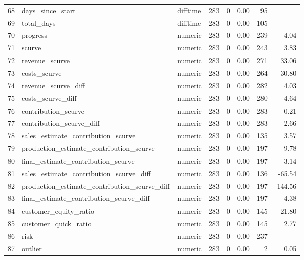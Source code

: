 \begin{sidewaystable}[ht]
\begin{tabular}{rllrrrrr}
  68 & days\_since\_start & difftime & 283 &   0 & 0.00 &  95 &  \\ 
  69 & total\_days & difftime & 283 &   0 & 0.00 & 105 &  \\ 
  70 & progress & numeric & 283 &   0 & 0.00 & 239 & 4.04 \\ 
  71 & scurve & numeric & 283 &   0 & 0.00 & 243 & 3.83 \\ 
  72 & revenue\_scurve & numeric & 283 &   0 & 0.00 & 271 & 33.06 \\ 
  73 & costs\_scurve & numeric & 283 &   0 & 0.00 & 264 & 30.80 \\ 
  74 & revenue\_scurve\_diff & numeric & 283 &   0 & 0.00 & 282 & 4.03 \\ 
  75 & costs\_scurve\_diff & numeric & 283 &   0 & 0.00 & 280 & 4.64 \\ 
  76 & contribution\_scurve & numeric & 283 &   0 & 0.00 & 283 & 0.21 \\ 
  77 & contribution\_scurve\_diff & numeric & 283 &   0 & 0.00 & 283 & -2.66 \\ 
  78 & sales\_estimate\_contribution\_scurve & numeric & 283 &   0 & 0.00 & 135 & 3.57 \\ 
  79 & production\_estimate\_contribution\_scurve & numeric & 283 &   0 & 0.00 & 197 & 9.78 \\ 
  80 & final\_estimate\_contribution\_scurve & numeric & 283 &   0 & 0.00 & 197 & 3.14 \\ 
  81 & sales\_estimate\_contribution\_scurve\_diff & numeric & 283 &   0 & 0.00 & 136 & -65.54 \\ 
  82 & production\_estimate\_contribution\_scurve\_diff & numeric & 283 &   0 & 0.00 & 197 & -144.56 \\ 
  83 & final\_estimate\_contribution\_scurve\_diff & numeric & 283 &   0 & 0.00 & 197 & -4.38 \\ 
  84 & customer\_equity\_ratio & numeric & 283 &   0 & 0.00 & 145 & 21.80 \\ 
  85 & customer\_quick\_ratio & numeric & 283 &   0 & 0.00 & 145 & 2.77 \\ 
  86 & risk & numeric & 283 &   0 & 0.00 & 237 &  \\ 
  87 & outlier & numeric & 283 &   0 & 0.00 &   2 & 0.05 \\ 
   \hline
\end{tabular}
\end{sidewaystable}
